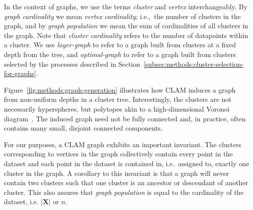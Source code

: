 In the context of graphs, we use the terms \textit{cluster} and \textit{vertex} interchangeably.
By \textit{graph cardinality} we mean \textit{vertex cardinality}; i.e.,\ the number of clusters in the graph, and by \textit{graph population} we mean the sum of cardinalities of all clusters in the graph.
Note that \textit{cluster cardinality} refers to the number of datapoints within a cluster.
We use \textit{layer-graph} to refer to a graph built from clusters at a fixed depth from the tree, and \textit{optimal-graph} to refer to a graph built from clusters selected by the processes described in Section~\ref{subsec:methods:cluster-selection-for-graphs}.

Figure~\ref{fig:methods:graph-generation} illustrates how CLAM induces a graph from non-uniform depths in a cluster tree.
Interestingly, the clusters are not necessarily hyperspheres, but polytopes akin to a high-dimensional Voronoi diagram~\cite{voronoi1908nouvelles}.
The induced graph need not be fully connected and, in practice, often contains many small, disjoint connected components.

For our purposes, a CLAM graph exhibits an important invariant.
The clusters corresponding to vertices in the graph collectively contain every point in the dataset and each point in the dataset is contained in, i.e.\ assigned to, exactly one cluster in the graph.
A corollary to this invariant is that a graph will never contain two clusters such that one cluster is an ancestor or descendant of another cluster.
This also assures that \textit{graph population} is equal to the cardinality of the dataset, i.e. $|\textbf{X}|$ or $n$.

